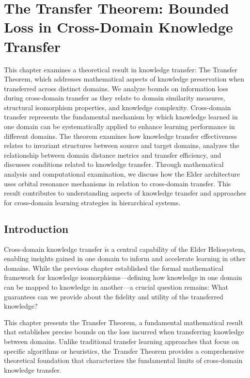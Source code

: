 \chapter{The Transfer Theorem: Bounded Loss in Cross-Domain Knowledge Transfer}

\begin{tcolorbox}[colback=DarkSkyBlue!5!white,colframe=DarkSkyBlue!75!black,title=Chapter Summary]
This chapter examines a theoretical result in knowledge transfer: The Transfer Theorem, which addresses mathematical aspects of knowledge preservation when transferred across distinct domains. We analyze bounds on information loss during cross-domain transfer as they relate to domain similarity measures, structural isomorphism properties, and knowledge complexity. Cross-domain transfer represents the fundamental mechanism by which knowledge learned in one domain can be systematically applied to enhance learning performance in different domains. The theorem examines how knowledge transfer effectiveness relates to invariant structures between source and target domains, analyzes the relationship between domain distance metrics and transfer efficiency, and discusses conditions related to knowledge transfer. Through mathematical analysis and computational examination, we discuss how the Elder architecture uses orbital resonance mechanisms in relation to cross-domain transfer. This result contributes to understanding aspects of knowledge transfer and approaches for cross-domain learning strategies in hierarchical systems.
\end{tcolorbox}

\section{Introduction}

Cross-domain knowledge transfer is a central capability of the Elder Heliosystem, enabling insights gained in one domain to inform and accelerate learning in other domains. While the previous chapter established the formal mathematical framework for knowledge isomorphisms—defining how knowledge in one domain can be mapped to knowledge in another—a crucial question remains: What guarantees can we provide about the fidelity and utility of the transferred knowledge?

This chapter presents the Transfer Theorem, a fundamental mathematical result that establishes precise bounds on the loss incurred when transferring knowledge between domains. Unlike traditional transfer learning approaches that focus on specific algorithms or heuristics, the Transfer Theorem provides a comprehensive theoretical foundation that characterizes the fundamental limits of cross-domain knowledge transfer.

